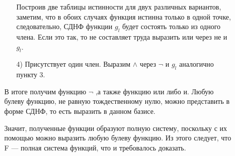 \begin{enumerate}
\begin{enumerate}
\begin{enumerate}
    Построив две таблицы истинности для двух различных вариантов, заметим, что в обоих случаях функция истинна только в одной точке, следовательно, СДНФ функции $g_l$
 будет состоять только из одного члена. Если это так, то не составляет труда выразить или через не
 и $g_l$.
    \item[4)] Присутствует один член.
     Выразим $\wedge$ через $\neg$ и $g_l$ аналогично пункту 3.
\end{enumerate}

В итоге получим функцию $\neg$ ,а также функцию или либо и. Любую булеву функцию, не равную тождественному нулю, можно представить в форме СДНФ, то есть выразить в данном базисе.

Значит, полученные функции образуют полную систему, поскольку с их помощью можно выразить любую булеву функцию. Из этого следует, что F — полная система функций, что и требовалось доказать.

\end{enumerate}
\end{enumerate}

